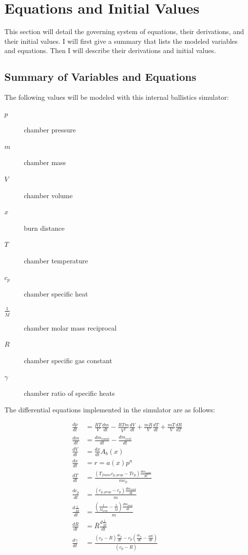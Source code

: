 \documentclass[12pt, letterpaper]{article}
\begin{document}
\section{Equations and Initial Values}

This section will detail the governing system of equations, their derivations, and their initial values. I will first give a summary that lists the modeled variables and equations. Then I will describe their derivations and initial values.

\subsection{Summary of Variables and Equations}

The following values will be modeled with this internal ballistics simulator:

\begin{description}
\item [$p$] chamber pressure
\item [$m$] chamber mass
\item [$V$] chamber volume
\item [$x$] burn distance
\item [$T$] chamber temperature
\item [$c_p$] chamber specific heat
\item [$\frac{1}{\bar{M}}$] chamber molar mass reciprocal
\item [$R$] chamber specific gas constant
\item [$\gamma$] chamber ratio of specific heats
\end{description}

The differential equations implemented in the simulator are as follows:

\begin{align*}
  \frac{dp}{dt} & = \frac{R T}{V} \frac{dm}{dt} - \frac{R T m}{V^2} \frac{dV}{dt} + \frac{m R}{V} \frac{dT}{dt} + \frac{m T}{V}\frac{dR}{dT} \\
  \frac{dm}{dt} &= \frac{dm_{comb}}{dt} - \frac{dm_{exit}}{dt} \\
  \frac{dV}{dt} &= \frac{dx}{dt} A_b(x) \\
  \frac{dx}{dt} &= r = a(x) p^n \\
  \frac{dT}{dt} &= \frac{\left( T_{flame} c_{p, prop} - T c_p \right) \frac{dm_{comb}}{dt}}{m c_p} \\
   \frac{d c_p}{dt} &= \frac{\left( c_{p, prop} - c_p \right) \frac{dm_{comb}}{dt}}{m} \\
    \frac{d \frac{1}{\bar{M}}}{dt} &= \frac{ \left( \frac{1}{\bar{M_{prop}}} - \frac{1}{\bar{M}}\right) \frac{dm_{prop}}{dt}}{m} \\
    \frac{dR}{dt} &= \bar{R} \frac{d \frac{1}{\bar{M}}}{dt} \\
    \frac{d \gamma}{dt} &= \frac{ \left( c_p - R \right) \frac{d c_p}{dt} - c_p \left( \frac{d c_p}{dt} - \frac{dR}{dt} \right)}{\left( c_p - R \right)}
\end{align*}
\end{document}
